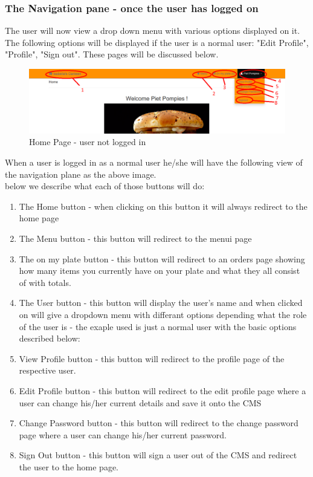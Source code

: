 \documentclass[a4paper,12pt]{article}
\begin{document}
\subsubsection{The Navigation pane - once the user has logged on}
The user will now view a drop down menu with various options displayed on it. The following options will be displayed if the user is a normal user: "Edit Profile", "Profile", "Sign out". These pages will be discussed below.

\begin{figure}[H]
  \centering
    \includegraphics[width=1.0\textwidth]{screenshots/HomePage2.png}
    \caption{Home Page - user not logged in } 
\end{figure}


When a user is logged in as a normal user he/she will have the following view of the navigation plane as the above image.\\ below we describe what each of those buttons will do: \\

\begin{enumerate}
 \item The Home button - when clicking on this button it will always redirect to the home page
\item The Menu button - this button will redirect to the menui page
\item The on my plate button - this button will redirect to an orders page showing how many items you currently have on your
plate and what they all consist of with totals.
\item The User button - this button will display the user's name and when clicked on will give a dropdown menu with differant options depending what the role of the user is - the exaple used is just a normal user with the basic options described below:
\item View Profile button - this button will redirect to the profile page of the respective user.
\item Edit Profile button - this button will redirect to the edit profile page where a user can change his/her current details and save it onto the CMS
\item Change Password button - this button will redirect to the change password page where a user can change his/her current password.
\item Sign Out button - this button will sign a user out of the CMS and redirect the user to the home page. 
\end{enumerate}
\end{document}
